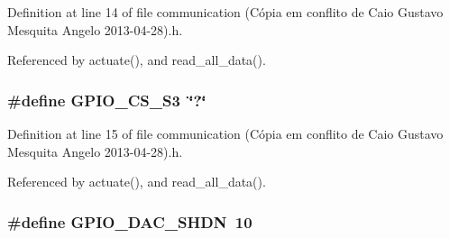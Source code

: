 Definition at line 14 of file communication (\-Cópia em conflito de Caio Gustavo Mesquita Angelo 2013-\/04-\/28).\-h.



Referenced by actuate(), and read\-\_\-all\-\_\-data().

\hypertarget{communication_01_07C_xC3_xB3pia_01em_01conflito_01de_01Caio_01Gustavo_01Mesquita_01Angelo_012013-04-28_08_8h_ad774f00fc71216488e24a803bf4eb6aa}{
\subsubsection[{G\-P\-I\-O\-\_\-\-C\-S\-\_\-\-S3}]{\setlength{\rightskip}{0pt plus 5cm}\#define G\-P\-I\-O\-\_\-\-C\-S\-\_\-\-S3~\char`\"{}?\char`\"{}}}\label{communication_01_07C_xC3_xB3pia_01em_01conflito_01de_01Caio_01Gustavo_01Mesquita_01Angelo_012013-04-28_08_8h_ad774f00fc71216488e24a803bf4eb6aa}


Definition at line 15 of file communication (\-Cópia em conflito de Caio Gustavo Mesquita Angelo 2013-\/04-\/28).\-h.



Referenced by actuate(), and read\-\_\-all\-\_\-data().

\hypertarget{communication_01_07C_xC3_xB3pia_01em_01conflito_01de_01Caio_01Gustavo_01Mesquita_01Angelo_012013-04-28_08_8h_a99fc26a9596a1cb1f0f9936dbb8ccca6}{
\subsubsection[{G\-P\-I\-O\-\_\-\-D\-A\-C\-\_\-\-S\-H\-D\-N}]{\setlength{\rightskip}{0pt plus 5cm}\#define G\-P\-I\-O\-\_\-\-D\-A\-C\-\_\-\-S\-H\-D\-N~10}}\label{communication_01_07C_xC3_xB3pia_01em_01conflito_01de_01Caio_01Gustavo_01Mesquita_01Angelo_012013-04-28_08_8h_a99fc26a9596a1cb1f0f9936dbb8ccca6}



